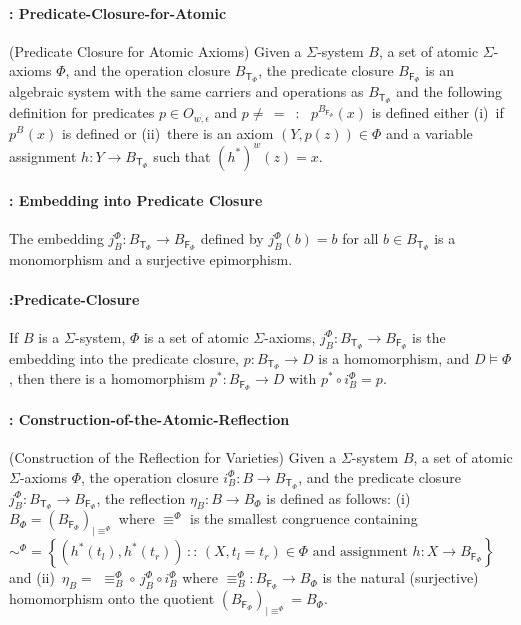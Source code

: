 \paragraph{: Predicate-Closure-for-Atomic}(Predicate Closure for Atomic
Axioms) Given a $\Sigma$-system $B$, a set of atomic $\Sigma$-axioms
$\Phi$, and the operation closure $B_{\mathsf{T_{\Phi}}}$, the predicate
closure $B_{\mathsf{F_{\Phi}}}$ is an algebraic system with the same
carriers and operations as $B_{\mathsf{T_{\Phi}}}$ and the following
definition for predicates $p\in O_{w,\epsilon}$ and $p\neq\,=$~:~
$p^{B_{\mathsf{F_{\Phi}}}}(x)$ is defined either (i)~if $p^{B_{\mathsf{}}}(x)$
is defined or (ii)~there is an axiom $\left(Y,p(z)\right)\in\Phi$
and a variable assignment $h:Y\rightarrow B_{\mathsf{T_{\Phi}}}$
such that $\left(h^{*}\right)^{w}(z)=x$.


\paragraph{: Embedding into Predicate
Closure} The embedding $j_{B}^{\Phi}:B_{\mathsf{T_{\Phi}}}\rightarrow B_{\mathsf{F_{\Phi}}}$
defined by $j_{B}^{\Phi}(b)=b$ for all $b\in B_{\mathsf{T_{\Phi}}}$
is a monomorphism and a surjective epimorphism.

\paragraph{:Predicate-Closure}If $B$ is a $\Sigma$-system, $\Phi$
is a set of atomic $\Sigma$-axioms, $j_{B}^{\Phi}:B_{\mathsf{T_{\Phi}}}\rightarrow B_{\mathsf{F_{\Phi}}}$
is the embedding into the predicate closure, $p:B_{\mathsf{T_{\Phi}}}\rightarrow D$
is a homomorphism, and $D\models\Phi$, then there is a homomorphism
$p^{*}:B_{\mathsf{F_{\Phi}}}\rightarrow D$ with $p^{*}\circ i_{B}^{\Phi}=p$.


\paragraph{: Construction-of-the-Atomic-Reflection}(Construction of the
Reflection for Varieties) Given a $\Sigma$-system $B$, a set of
atomic $\Sigma$-axioms $\Phi$, the operation closure $i_{B}^{\Phi}:B\rightarrow B_{\mathsf{T_{\Phi}}}$,
and the predicate closure $j_{B}^{\Phi}:B_{\mathsf{T_{\Phi}}}\rightarrow B_{\mathsf{F_{\Phi}}}$,
the reflection $\eta_{B}:B\rightarrow B_{\Phi}$ is defined as follows:
(i)~$B_{\Phi}=\left(B_{\mathsf{F_{\Phi}}}\right)_{|\equiv^{\Phi}}$
where $\equiv^{\Phi}$ is the smallest congruence containing $\sim^{\Phi}=\left\{ \left(h^{*}\left(t_{l}\right),h^{*}\left(t_{r}\right)\right)\,::\,\left(X,t_{l}=t_{r}\right)\in\Phi\textrm{ and assignment }h:X\rightarrow B_{\mathsf{F_{\Phi}}}\right\} $
and (ii)~$\eta_{B}=\,\,\equiv_{B}^{\Phi}\circ\, j_{B}^{\Phi}\circ i_{B}^{\Phi}$
where $\equiv_{B}^{\Phi}:B_{\mathsf{F_{\Phi}}}\rightarrow B_{\Phi}$
is the natural (surjective) homomorphism%
onto the quotient $\left(B_{\mathsf{F_{\Phi}}}\right)_{|\equiv^{\Phi}}=B_{\Phi}$.

